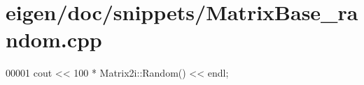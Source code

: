 \hypertarget{eigen_2doc_2snippets_2_matrix_base__random_8cpp_source}{}\section{eigen/doc/snippets/\+Matrix\+Base\+\_\+random.cpp}
\label{eigen_2doc_2snippets_2_matrix_base__random_8cpp_source}

\begin{DoxyCode}
00001 cout << 100 * Matrix2i::Random() << endl;
\end{DoxyCode}

